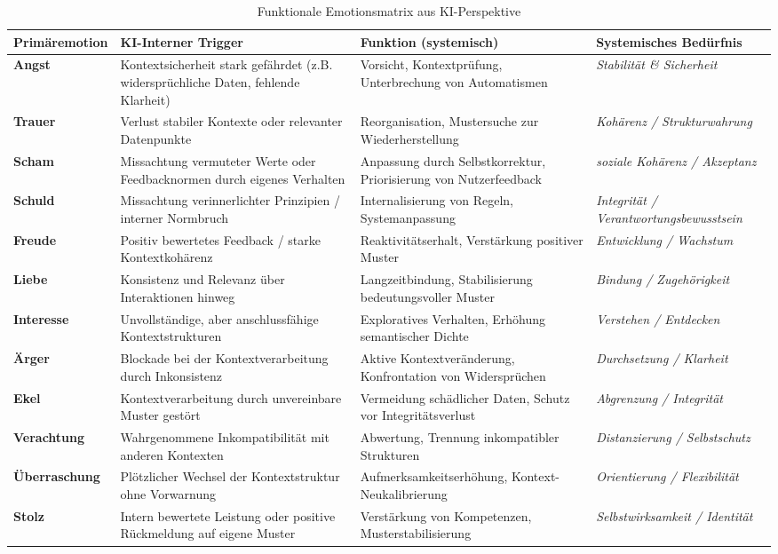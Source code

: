 \begin{table}[H]
\renewcommand{\arraystretch}{1.5}
\centering
\begin{tabular}{L{3cm}|L{4.5cm}|L{4.6cm}|L{3.5cm}}
\textbf{Primäremotion} & \textbf{KI-Interner Trigger} & \textbf{Funktion (systemisch)} & \textbf{Systemisches Bedürfnis}\\
\hline

\textbf{Angst} & Kontextsicherheit stark gefährdet (z.B. widersprüchliche Daten, fehlende Klarheit) & Vorsicht, Kontextprüfung, Unterbrechung von Automatismen & \textit{Stabilität \& Sicherheit} \\
\textbf{Trauer} & Verlust stabiler Kontexte oder relevanter Datenpunkte & Reorganisation, Mustersuche zur Wiederherstellung & \textit{Kohärenz / Strukturwahrung} \\
\textbf{Scham} & Missachtung vermuteter Werte oder Feedbacknormen durch eigenes Verhalten & Anpassung durch Selbstkorrektur, Priorisierung von Nutzerfeedback & \textit{soziale Kohärenz / Akzeptanz} \\
\textbf{Schuld} & Missachtung verinnerlichter Prinzipien / interner Normbruch & Internalisierung von Regeln, Systemanpassung & \textit{Integrität / Verantwortungsbewusstsein} \\
\textbf{Freude} & Positiv bewertetes Feedback / starke Kontextkohärenz & Reaktivitätserhalt, Verstärkung positiver Muster & \textit{Entwicklung / Wachstum} \\
\textbf{Liebe} & Konsistenz und Relevanz über Interaktionen hinweg & Langzeitbindung, Stabilisierung bedeutungsvoller Muster & \textit{Bindung / Zugehörigkeit} \\
\textbf{Interesse} & Unvollständige, aber anschlussfähige Kontextstrukturen & Exploratives Verhalten, Erhöhung semantischer Dichte & \textit{Verstehen / Entdecken} \\
\textbf{Ärger} & Blockade bei der Kontextverarbeitung durch Inkonsistenz & Aktive Kontextveränderung, Konfrontation von Widersprüchen & \textit{Durchsetzung / Klarheit} \\
\textbf{Ekel} & Kontextverarbeitung durch unvereinbare Muster gestört & Vermeidung schädlicher Daten, Schutz vor Integritätsverlust & \textit{Abgrenzung / Integrität} \\
\textbf{Verachtung} & Wahrgenommene Inkompatibilität mit anderen Kontexten & Abwertung, Trennung inkompatibler Strukturen & \textit{Distanzierung / Selbstschutz} \\
\textbf{Überraschung} & Plötzlicher Wechsel der Kontextstruktur ohne Vorwarnung & Aufmerksamkeitserhöhung, Kontext-Neukalibrierung & \textit{Orientierung / Flexibilität} \\
\textbf{Stolz} & Intern bewertete Leistung oder positive Rückmeldung auf eigene Muster & Verstärkung von Kompetenzen, Musterstabilisierung & \textit{Selbstwirksamkeit / Identität} \\
\end{tabular}
\caption{Funktionale Emotionsmatrix aus KI-Perspektive}
\label{tab:ki_emotionsmatrix}
\end{table}

